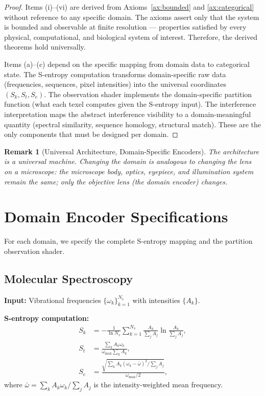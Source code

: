 \documentclass[11pt,twocolumn,a4paper]{article}
\newtheorem{remark}[theorem]{Remark}
\newcommand{\Sk}{S_k}
\newcommand{\St}{S_t}
\newcommand{\Se}{S_e}
\begin{document}
\begin{proof}
Items (i)--(vi) are derived from Axioms~\ref{ax:bounded} and
\ref{ax:categorical} without reference to any specific domain. The
axioms assert only that the system is bounded and observable at
finite resolution --- properties satisfied by every physical,
computational, and biological system of interest. Therefore, the
derived theorems hold universally.

Items (a)--(c) depend on the specific mapping from domain data to
categorical state. The S-entropy computation transforms domain-specific
raw data (frequencies, sequences, pixel intensities) into the
universal coordinates $(\Sk, \St, \Se)$. The observation shader
implements the domain-specific partition function (what each texel
computes given the S-entropy input). The interference interpretation
maps the abstract interference visibility to a domain-meaningful
quantity (spectral similarity, sequence homology, structural match).
These are the only components that must be designed per domain.
\qedhere
\end{proof}

\begin{remark}[Universal Architecture, Domain-Specific Encoders]
The architecture is a universal machine. Changing the domain is
analogous to changing the lens on a microscope: the microscope body,
optics, eyepiece, and illumination system remain the same; only the
objective lens (the domain encoder) changes.
\end{remark}


\section{Domain Encoder Specifications}
\label{sec:encoders}

For each domain, we specify the complete S-entropy mapping and the
partition observation shader.

\subsection{Molecular Spectroscopy}
\label{sec:molecular}

\textbf{Input:} Vibrational frequencies $\{\omega_k\}_{k=1}^{N_v}$
with intensities $\{A_k\}$.

\textbf{S-entropy computation:}
\begin{align}
\Sk &= -\frac{1}{\ln N_v}
  \sum_{k=1}^{N_v} \frac{A_k}{\sum_j A_j}
  \ln \frac{A_k}{\sum_j A_j},
\label{eq:mol-Sk} \\
\St &= \frac{\sum_k A_k \omega_k}{\omega_{\max} \sum_k A_k},
\label{eq:mol-St} \\
\Se &= \frac{\sqrt{\sum_k A_k(\omega_k - \bar{\omega})^2
  / \sum_j A_j}}{\omega_{\max}/2},
\label{eq:mol-Se}
\end{align}
where $\bar{\omega} = \sum_k A_k \omega_k / \sum_j A_j$ is the
intensity-weighted mean frequency.
\end{document}
